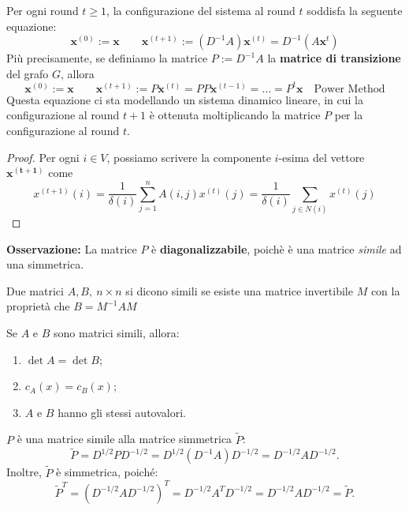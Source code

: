 \begin{lemma}
    Per ogni round $t \geq 1$, la configurazione del sistema al round $t$ soddisfa la seguente equazione:
    \begin{equation}\label{eq:1}
        \mathbf{x}^{(0)} := \mathbf{x} \qquad \mathbf{x}^{(t+1)} := (D^{-1}A)\mathbf{x}^{(t)} = D^{-1} (A\mathbf{x}^t) 
    \end{equation}
    Più precisamente, se definiamo la matrice $P := D^{-1}A$ la \textbf{matrice di transizione} del grafo $G$, allora
    \begin{equation}\label{eq:2}
        \mathbf{x}^{(0)} := \mathbf{x} \qquad \mathbf{x}^{(t+1)} := P\mathbf{x}^{(t)} = PP\mathbf{x}^{(t-1)} = \dots = P^t\mathbf{x} \quad \text{Power Method}
    \end{equation}
    Questa equazione ci sta modellando un sistema dinamico lineare, in cui la configurazione al round $t + 1$ è ottenuta moltiplicando la matrice $P$ per la configurazione al round $t$.
    \begin{proof}
        Per ogni $i \in V$, possiamo scrivere la componente $i$-esima del vettore $\mathbf{x^{(t+1)}}$ come
        \[
            x^{(t+1)}(i) = \frac{1}{\delta(i)} \sum_{j = 1}^{n} A(i, j)x^{(t)}(j) = \frac{1}{\delta(i)} \sum_{j \in N(i)}x^{(t)}(j)
        \]
    \end{proof}
\end{lemma}

\textbf{Osservazione:} La matrice $P$ è \textbf{diagonalizzabile}, poichè è una matrice \textit{simile} ad una simmetrica.

\begin{definizione}
    Due matrici $A, B,\ n \times n$ si dicono simili se esiste una matrice invertibile $M$ con la proprietà che $B = M^{-1}AM$
\end{definizione}

\begin{teorema}
    Se $A$ e $B$ sono matrici simili, allora:
    \begin{enumerate}
        \item $\det A = \det B$;
        \item $c_A(x) = c_B(x)$;
        \item $A$ e $B$ hanno gli stessi autovalori.
    \end{enumerate}
\end{teorema}

\begin{lemma}
    $P$ è una matrice simile alla matrice simmetrica $\tilde{P}$:
    \[
        \tilde{P} = D^{1/2}PD^{-1/2} = D^{1/2}\left(D^{-1}A\right)D^{-1/2} = D^{-1/2}AD^{-1/2}.
    \]
    Inoltre, $\tilde{P}$ è simmetrica, poiché:
    \[
        \tilde{P}^T = \left(D^{-1/2}AD^{-1/2}\right)^T = D^{-1/2}A^TD^{-1/2} = D^{-1/2}AD^{-1/2} = \tilde{P}.
    \]
\end{lemma}

